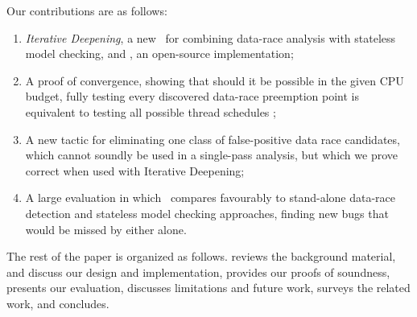 Our contributions are as follows:
\begin{enumerate}
	\item {\em Iterative Deepening}, a new ~for combining data-race analysis with stateless model checking, and \quicksand, an open-source implementation;
	\item A proof of convergence, showing that should it be possible in the given CPU budget,
		fully testing every discovered data-race preemption point is equivalent to testing all possible thread schedules ;
	\item A new tactic for eliminating one class of false-positive data race candidates,
		which cannot soundly be used in a single-pass analysis,
		but which we prove correct when used with Iterative Deepening;
	\item A large evaluation in which \quicksand~compares favourably to stand-alone data-race detection and stateless model checking approaches, finding new bugs that would be missed by either alone.
\end{enumerate}

The rest of the paper is organized as follows.
\sect{\ref{sec:overview}} reviews the background material, %
\sect{\ref{sec:design}} and \sect{\ref{sec:implementation}} discuss our design and implementation, %
\sect{\ref{sec:soundness}} provides our proofs of soundness, %
\sect{\ref{sec:eval}} presents our evaluation,
\sect{\ref{sec:future}} discusses limitations and future work,
\sect{\ref{sec:related}} surveys the related work,
and \sect{\ref{sec:conclusion}} concludes.
